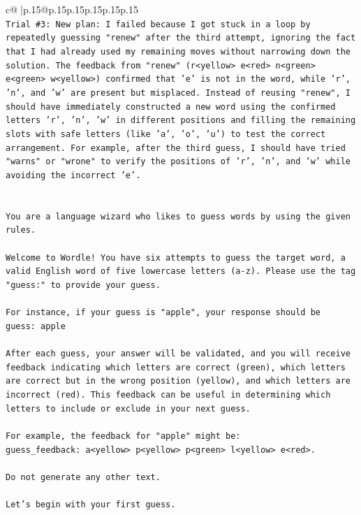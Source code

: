 \documentclass{article}
\begin{document}
{\begin{supertabular}{c@{$\;$}|p{.15\linewidth}@{}p{.15\linewidth}p{.15\linewidth}p{.15\linewidth}p{.15\linewidth}p{.15\linewidth}}
{{{\\ 
\texttt{Trial \#3: New plan: I failed because I got stuck in a loop by repeatedly guessing "renew" after the third attempt, ignoring the fact that I had already used my remaining moves without narrowing down the solution. The feedback from "renew" (r<yellow> e<red> n<green> e<green> w<yellow>) confirmed that 'e' is not in the word, while 'r', 'n', and 'w' are present but misplaced. Instead of reusing "renew", I should have immediately constructed a new word using the confirmed letters 'r', 'n', 'w' in different positions and filling the remaining slots with safe letters (like 'a', 'o', 'u') to test the correct arrangement. For example, after the third guess, I should have tried "warns" or "wrone" to verify the positions of 'r', 'n', and 'w' while avoiding the incorrect 'e'.} \\
\\ 
\\ 
\texttt{You are a language wizard who likes to guess words by using the given rules.} \\
\\ 
\texttt{Welcome to Wordle! You have six attempts to guess the target word, a valid English word of five lowercase letters (a{-}z). Please use the tag "guess:" to provide your guess.} \\
\\ 
\texttt{For instance, if your guess is "apple", your response should be} \\
\texttt{guess: apple} \\
\\ 
\texttt{After each guess, your answer will be validated, and you will receive feedback indicating which letters are correct (green), which letters are correct but in the wrong position (yellow), and which letters are incorrect (red). This feedback can be useful in determining which letters to include or exclude in your next guess.} \\
\\ 
\texttt{For example, the feedback for "apple" might be:} \\
\texttt{guess\_feedback: a<yellow> p<yellow> p<green> l<yellow> e<red>.} \\
\\ 
\texttt{Do not generate any other text.} \\
\\ 
\texttt{Let's begin with your first guess.} \\
            }
        }
    }
     \\ \\


\end{supertabular}}
\end{document}
